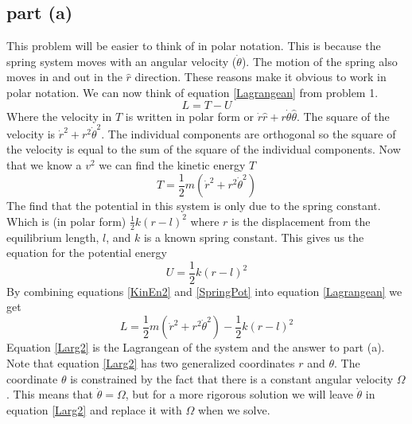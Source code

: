 \documentclass[11pt]{article}
\numberwithin{equation}{section}
\begin{document}
\subsection{part (a)}
This problem will be easier to think of in polar notation. This is because the spring system moves with an angular velocity ($\dot{\theta}$). The motion of the spring also moves in and out in the $\hat{r}$ direction. These reasons make it obvious to work in polar notation. We can now think of equation \ref{Lagrangean} from problem 1.
$$L = T - U$$
Where the velocity in $T$ is written in polar form or $\dot{r}\hat{r} + r\dot{\theta}\hat{\theta}$. The square of the velocity is $\dot{r}^2 + r^2\dot{\theta}^2$. The individual components are orthogonal so the square of the velocity is equal to the sum of the square of the individual components. Now that we know a $v^2$ we can find the kinetic energy $T$
\begin{equation}
T = \frac{1}{2}m(\dot{r}^2 + r^2\dot{\theta}^2)
\label{KinEn2}
\end{equation}
The find that the potential in this system is only due to the spring constant. Which is (in polar form) $\frac{1}{2}k(r-l)^2$ where $r$ is the displacement from the equilibrium length, $l$, and $k$ is a known spring constant. This gives us the equation for the potential energy
\begin{equation}
U = \frac{1}{2}k(r - l)^2
\label{SpringPot}
\end{equation}
By combining equations \ref{KinEn2} and \ref{SpringPot} into equation \ref{Lagrangean} we get
\begin{equation}
L = \frac{1}{2}m(\dot{r}^2 + r^2\dot{\theta}^2) - \frac{1}{2}k(r-l)^2
\label{Larg2}
\end{equation}
Equation \ref{Larg2} is the Lagrangean of the system and the answer to part (a). Note that equation \ref{Larg2} has two generalized coordinates $r$ and $\theta$. The coordinate $\theta$ is constrained by the fact that there is a constant angular velocity $\Omega$. This means that $\dot{\theta} = \Omega$, but for a more rigorous solution we will leave $\dot{\theta}$ in equation \ref{Larg2} and replace it with $\Omega$ when we solve.
\begin{center}
\end{center}
\end{document}
